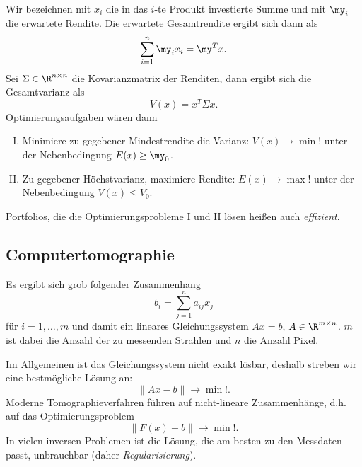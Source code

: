 

Wir bezeichnen mit $x_i$ die in das $i$-te Produkt investierte Summe und mit $\my_i$ die erwartete Rendite.
Die erwartete Gesamtrendite ergibt sich dann als
\[
	\sum_{i=1}^n \my_i x_i = \my^T x.
\]
Sei $\Sigma \in \R^{n\times n}$ die Kovarianzmatrix der Renditen, dann ergibt sich die Gesamtvarianz als
\[
	V(x) = x^T \Sigma x.
\]
Optimierungsaufgaben wären dann
\begin{enumerate}[I.]
	\item
		Minimiere zu gegebener Mindestrendite die Varianz:
		$V(x) \to \min!$ unter der Nebenbedingung $E(x) \ge \my_0$.
	\item
		Zu gegebener Höchstvarianz, maximiere Rendite:
		$E(x) \to \max!$ unter der Nebenbedingung $V(x) \le V_0$.
\end{enumerate}
Portfolios, die die Optimierungsprobleme I und II lösen heißen auch \emph{effizient}.

\subsection{Computertomographie}

Es ergibt sich grob folgender Zusammenhang
\[
	b_i = \sum_{j=1}^n a_{ij} x_j
\]
für $i = 1, \dotsc, m$ und damit ein lineares Gleichungssystem $Ax = b$, $A \in \R^{m\times n}$.
$m$ ist dabei die Anzahl der zu messenden Strahlen und $n$ die Anzahl Pixel.

Im Allgemeinen ist das Gleichungssystem nicht exakt lösbar, deshalb streben wir eine bestmögliche Lösung an:
\[
	\|Ax - b\| \to \min!.
\]
Moderne Tomographieverfahren führen auf nicht-lineare Zusammenhänge, d.h. auf das Optimierungsproblem
\[
	\|F(x) - b\| \to \min!.
\]
In vielen inversen Problemen ist die Lösung, die am besten zu den Messdaten passt, unbrauchbar (daher \emph{Regularisierung}).



